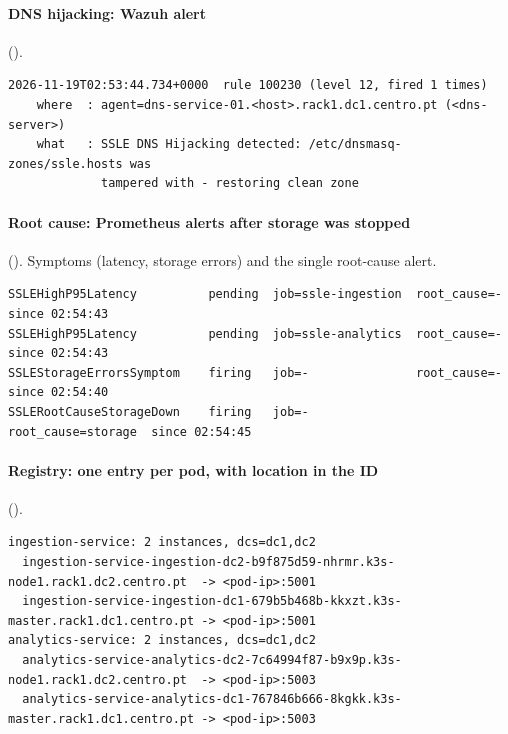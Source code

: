 \paragraph{DNS hijacking: Wazuh alert} ().
{\footnotesize
\begin{verbatim}
2026-11-19T02:53:44.734+0000  rule 100230 (level 12, fired 1 times)
    where  : agent=dns-service-01.<host>.rack1.dc1.centro.pt (<dns-server>)
    what   : SSLE DNS Hijacking detected: /etc/dnsmasq-zones/ssle.hosts was
             tampered with - restoring clean zone
\end{verbatim}}

\paragraph{Root cause: Prometheus alerts after storage was stopped} ().
Symptoms (latency, storage errors) and the single root-cause alert.
{\footnotesize
\begin{verbatim}
SSLEHighP95Latency          pending  job=ssle-ingestion  root_cause=-        since 02:54:43
SSLEHighP95Latency          pending  job=ssle-analytics  root_cause=-        since 02:54:43
SSLEStorageErrorsSymptom    firing   job=-               root_cause=-        since 02:54:40
SSLERootCauseStorageDown    firing   job=-               root_cause=storage  since 02:54:45
\end{verbatim}}

\paragraph{Registry: one entry per pod, with location in the ID} ().
{\footnotesize
\begin{verbatim}
ingestion-service: 2 instances, dcs=dc1,dc2
  ingestion-service-ingestion-dc2-b9f875d59-nhrmr.k3s-node1.rack1.dc2.centro.pt  -> <pod-ip>:5001
  ingestion-service-ingestion-dc1-679b5b468b-kkxzt.k3s-master.rack1.dc1.centro.pt -> <pod-ip>:5001
analytics-service: 2 instances, dcs=dc1,dc2
  analytics-service-analytics-dc2-7c64994f87-b9x9p.k3s-node1.rack1.dc2.centro.pt  -> <pod-ip>:5003
  analytics-service-analytics-dc1-767846b666-8kgkk.k3s-master.rack1.dc1.centro.pt -> <pod-ip>:5003
\end{verbatim}}
